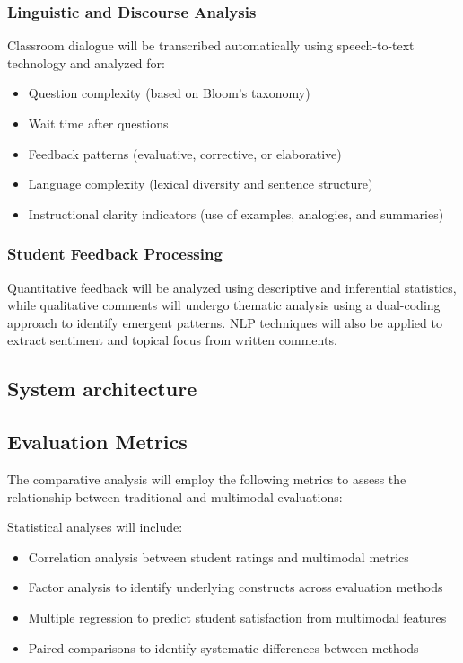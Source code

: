 \subsubsection{Linguistic and Discourse Analysis}
Classroom dialogue will be transcribed automatically using speech-to-text technology and analyzed for:
\begin{itemize}
    \item Question complexity (based on Bloom's taxonomy)
    \item Wait time after questions
    \item Feedback patterns (evaluative, corrective, or elaborative)
    \item Language complexity (lexical diversity and sentence structure)
    \item Instructional clarity indicators (use of examples, analogies, and summaries)
\end{itemize}

\subsubsection{Student Feedback Processing}
Quantitative feedback will be analyzed using descriptive and inferential statistics, while qualitative comments will undergo thematic analysis using a dual-coding approach to identify emergent patterns. NLP techniques will also be applied to extract sentiment and topical focus from written comments.

\subsection{System architecture}


\subsection{Evaluation Metrics}
The comparative analysis will employ the following metrics to assess the relationship between traditional and multimodal evaluations:


Statistical analyses will include:
\begin{itemize}
    \item Correlation analysis between student ratings and multimodal metrics
    \item Factor analysis to identify underlying constructs across evaluation methods
    \item Multiple regression to predict student satisfaction from multimodal features
    \item Paired comparisons to identify systematic differences between methods
\end{itemize}

